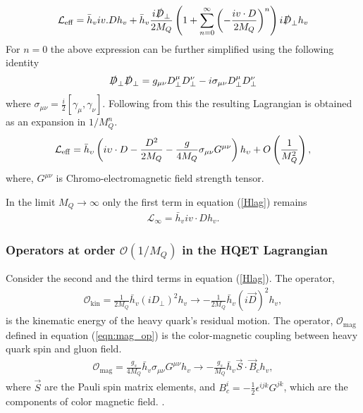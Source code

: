 \begin{eqnarray}
\mathcal{L}_{\mathrm{eff}}=\bar{h}_{v}i v . D h_{v}+\bar{h}_{v}\frac{i \slashed{ D}_{\perp}}{2 M_{Q}}\left(1+\sum_{n=0}^{\infty}\left(-\frac{i v \cdot D}{2 M_{Q}}\right)^{n}\right) i \slashed{ D}_{\perp} h_{v}
\end{eqnarray}
For $n=0$ the above expression can be further simplified using the following identity
\begin{eqnarray}
\slashed{D}_{\perp} \slashed{ D}_{\perp}=g_{\mu \nu} D_{\perp}^{\mu} D_{\perp}^{\nu}-i \sigma_{\mu \nu} D_{\perp}^{\mu} D_{\perp}^{\nu}
\end{eqnarray}
where $\sigma_{\mu \nu}=\frac{i}{2}\left[\gamma_{\mu}, \gamma_{\nu}\right]$.
Following from this the resulting Lagrangian is obtained as an expansion in $1/M_{Q}^{n}$.
\begin{eqnarray}\label{Hlag}
{\cal L}_{\rm eff}=\bar{h}_{\upsilon}\left(i\upsilon \cdot D-\dfrac{D^{2}}{2M_{Q}}-\dfrac{g}{4M_{Q}}\sigma_{\mu\nu}G^{\mu\nu}\right)h_{\upsilon}+O\left(\dfrac{1}{M_{Q}^{2}}\right),
\end{eqnarray}
where, $G^{\mu\nu}$ is Chromo-electromagnetic field strength tensor.\par
 In the limit $M_Q\rightarrow \infty$ only the first term in equation (\ref{Hlag}) remains
\begin{eqnarray}\label{eqn:HQET_Lag_Infty}
\mathcal{L}_{\infty}=\bar{h}_{v} i v \cdot D h_{v}.
\end{eqnarray} 
\subsubsection{Operators at order $\mathcal{O}(1/M_Q)$ in the HQET Lagrangian}\label{sec:order_1/M_Q }
\vspace{-0.3cm}
Consider the second and the third terms in equation (\ref{Hlag}). The operator, 
\begin{eqnarray}
\mathcal{O}_{\mathrm{kin}}=\frac{1}{2 M_{Q}} \bar{h}_{v}\left(i D_{\perp}\right)^{2} h_{v} \rightarrow-\frac{1}{2 M_{Q}} \bar{h}_{v}(i \vec{D})^{2} h_{v},
\end{eqnarray}
is the kinematic energy of the heavy quark's residual motion. The operator, $\mathcal{O}_{\mathrm{mag}}$ defined in equation (\ref{eqn:mag_op}) is the color-magnetic coupling between heavy quark spin and gluon field.
\begin{eqnarray}\label{eqn:mag_op}
\mathcal{O}_{\mathrm{mag}}=\frac{g_{s}}{4 M_{Q}} \bar{h}_{v} \sigma_{\mu \nu} G^{\mu \nu} h_{v} \rightarrow-\frac{g_{s}}{M_{Q}} \bar{h}_{v} \vec{S} \cdot \vec{B}_{c} h_{v},
\end{eqnarray}
where $\vec{S}$ are the Pauli spin matrix elements, and $B_{c}^{i}=-\frac{1}{2} \epsilon^{i j k} G^{j k}$, which are the components of color magnetic field. \cite{Pauli:1941zz, Dittrich:1985yb, Lee:2006nc}.\par

